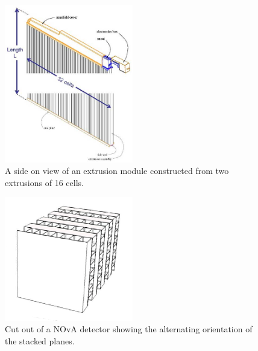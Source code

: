 

\begin{figure}
  \centering
  \includegraphics[width=0.5\textwidth]{../../img/det/gen/extrusionModule.jpg}
  \caption{A side on view of an extrusion module constructed from two
    extrusions of 16 cells. }
  \label{fig:module}
\end{figure}

\begin{figure}
  \centering
  \includegraphics[width=0.5\textwidth]{../../img/det/gen/planes.png}
  \caption{Cut out of a NOvA detector showing the alternating
    orientation of the stacked planes.}
  \label{fig:stackedPlanes}
\end{figure}


